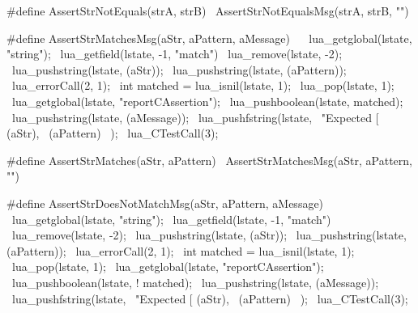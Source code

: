 #define AssertStrNotEquals(strA, strB) \
  AssertStrNotEqualsMsg(strA, strB, "")
\stopCHeader

\stopTestSuite

\startTestSuite[assertStrMatches]

\startCHeader
#define AssertStrMatchesMsg(aStr, aPattern, aMessage) \
{                                                     \
  lua_getglobal(lstate, "string");                    \
  lua_getfield(lstate, -1, "match")                   \
  lua_remove(lstate, -2);                             \
  lua_pushstring(lstate, (aStr));                     \
  lua_pushstring(lstate, (aPattern));                 \
  lua_errorCall(2, 1);                                \
  int matched = lua_isnil(lstate, 1);                 \
  lua_pop(lstate, 1);                                 \
  lua_getglobal(lstate, "reportCAssertion");          \
  lua_pushboolean(lstate, matched);                   \
  lua_pushstring(lstate, (aMessage));                 \
  lua_pushfstring(lstate,                             \
      "Expected [%
      (aStr),                                         \
      (aPattern)                                      \
    );                                                \
  lua_CTestCall(3);                                   \
}

#define AssertStrMatches(aStr, aPattern) \
  AssertStrMatchesMsg(aStr, aPattern, "")
\stopCHeader

\stopTestSuite

\startTestSuite[assertStrNotMatch]

\startCHeader
#define AssertStrDoesNotMatchMsg(aStr, aPattern, aMessage) \
{                                                          \
  lua_getglobal(lstate, "string");                         \
  lua_getfield(lstate, -1, "match")                        \
  lua_remove(lstate, -2);                                  \
  lua_pushstring(lstate, (aStr));                          \
  lua_pushstring(lstate, (aPattern));                      \
  lua_errorCall(2, 1);                                     \
  int matched = lua_isnil(lstate, 1);                      \
  lua_pop(lstate, 1);                                      \
  lua_getglobal(lstate, "reportCAssertion");               \
  lua_pushboolean(lstate, ! matched);                      \
  lua_pushstring(lstate, (aMessage));                      \
  lua_pushfstring(lstate,                                  \
      "Expected [%
      (aStr),                                              \
      (aPattern)                                           \
    );                                                     \
  lua_CTestCall(3);                                        \
}

